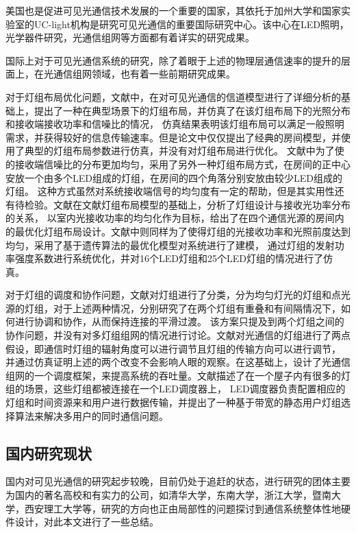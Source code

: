 美国也是促进可见光通信技术发展的一个重要的国家，其依托于加州大学和国家实验室的UC-light机构是研究可见光通信的重要国际研究中心。该中心在LED照明，光学器件研究，光通信组网等方面都有着详实的研究成果\cite{UcLight}。

国际上对于可见光通信系统的研究，除了着眼于上述的物理层通信速率的提升的层面上，在光通信组网领域，也有着一些前期研究成果。

对于灯组布局优化问题，文献\cite{KomineT2004}中，在对可见光通信的信道模型进行了详细分析的基础上，提出了一种在典型场景下的灯组布局，并仿真了在该灯组布局下的光照分布和接收端接收功率和信噪比的情况，
仿真结果表明该灯组布局可以满足一般照明需求，并获得较好的信息传输速率。但是论文中仅仅提出了经典的房间模型，并使用了典型的灯组布局参数进行仿真，并没有对灯组布局进行优化。
文献\cite{AzizanLA2012}中为了使的接收端信噪比的分布更加均匀，采用了另外一种灯组布局方式，在房间的正中心安放一个由多个LED组成的灯组，在房间的四个角落分别安放由较少LED组成的灯组。
这种方式虽然对系统接收端信号的均匀度有一定的帮助，但是其实用性还有待检验。文献\cite{DingDeQiang2007}在文献\cite{KomineT2004}灯组布局模型的基础上，分析了灯组设计与接收光功率分布的关系，
以室内光接收功率的均匀化作为目标，给出了在四个通信光源的房间内的最优化灯组布局设计。文献\cite{DingJP20121}\cite{DingJP20122}中则同样为了使得灯组的光接收功率和光照前度达到均匀，采用了基于遗传算法的最优化模型对系统进行了建模，
通过灯组的发射功率强度系数进行系统优化，并对16个LED灯组和25个LED灯组的情况进行了仿真。

对于灯组的调度和协作问题，文献\cite{Vegni2012}对灯组进行了分类，分为均匀灯光的灯组和点光源的灯组，对于上述两种情况，分别研究了在两个灯组有重叠和有间隔情况下，如何进行协调和协作，从而保持连接的平滑过渡。
该方案只提及到两个灯组之间的协作问题，并没有对多灯组组网的情况进行讨论。文献\cite{LiYY2012}对光通信的灯组进行了两点假设，即通信时灯组的辐射角度可以进行调节且灯组的传输方向可以进行调节，
并通过仿真证明上述的两个改变不会影响人眼的观察。在这基础上，设计了光通信组网的一个调度框架，来提高系统的吞吐量。文献\cite{HuangZT2012}描述了在一个屋子内有很多的灯组的场景，这些灯组都被连接在一个LED调度器上，
LED调度器负责配置相应的灯组和时间资源来和用户进行数据传输，并提出了一种基于带宽的静态用户灯组选择算法来解决多用户的同时通信问题。

\subsection{国内研究现状}
国内对可见光通信的研究起步较晚，目前仍处于追赶的状态，进行研究的团体主要为国内的著名高校和有实力的公司，如清华大学，东南大学，浙江大学，暨南大学，西安理工大学等，研究的方向也正由局部性的问题探讨到通信系统整体性地硬件设计，对此本文进行了一些总结。

